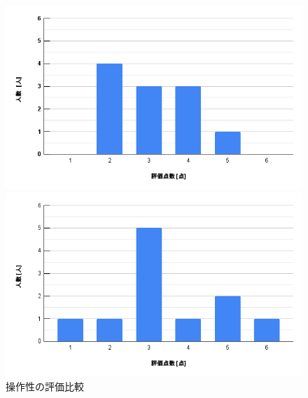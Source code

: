 \documentclass{ltjsreport}
\begin{document}
		\begin{figure}[H]
		\centering
		\begin{minipage}{0.45\columnwidth}
		\centering
		\includegraphics[width = \columnwidth]{../figs/PC-2.png}
		\end{minipage}
		\hspace{0.04\columnwidth}
		\begin{minipage}{0.45\columnwidth}
		\centering
		\includegraphics[width = \columnwidth]{../figs/iOS-2.png}
		\end{minipage}
		\caption{操作性の評価比較}
		\label{fig:sousasei}
		\end{figure}
\end{document}
